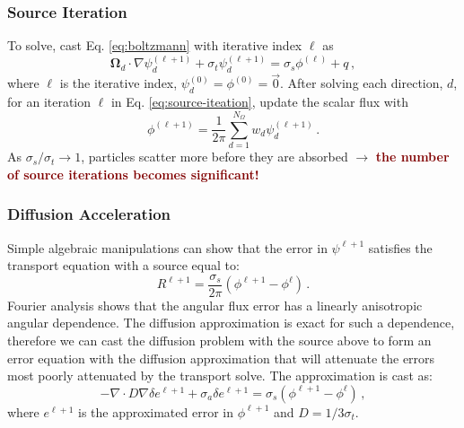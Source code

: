 \documentclass[xcolor={usenames,dvipsnames,svgnames,table}, 10pt]{beamer}
\newcommand{\vo}{\pmb{\Omega}} %
\begin{document}

\begin{frame}\frametitle{Source Iteration}
	To solve, cast Eq. \eqref{eq:boltzmann} with iterative index $\ell$ as
	\begin{equation}
		\label{eq:source-iteation}
		\vo_d \cdot \nabla \psi_d^{(\ell + 1)} + \sigma_t \psi_d^{(\ell + 1)} = \sigma_s \phi^{(\ell)} + q\,,
	\end{equation}
	where $\ell$ is the iterative index, $\psi_d^{(0)} = \phi^{(0)} = \vec{0}$. After solving each direction, $d$, for an iteration $\ell$ in Eq. \eqref{eq:source-iteation}, update the scalar flux with
	\[
		\phi^{(\ell + 1)} = \frac{1}{2\pi} \sum_{d = 1}^{N_\Omega} w_d \psi_d^{(\ell + 1)}\,.
	\]
	As $\sigma_s / \sigma_t \to 1$, particles scatter more before they are absorbed $\rightarrow$ \textbf{\textcolor{Maroon}{the number of source iterations becomes significant!}} 
\end{frame}


\begin{frame}\frametitle{Diffusion Acceleration}
	Simple algebraic manipulations can show that the error in $\psi^{\ell + 1}$ satisfies the transport equation with a source equal to:
	\[
		R^{\ell + 1} = \frac{\sigma_s}{2\pi} (\phi^{\ell + 1} - \phi^\ell)\,.
	\]
	Fourier analysis shows that the angular flux error has a linearly anisotropic angular dependence. The diffusion approximation is exact for such a dependence, therefore we can cast the diffusion problem with the source above to form an error equation with the diffusion approximation that will attenuate the errors most poorly attenuated by the transport solve. The approximation is cast as:
	\begin{equation}
		\label{eq:diffusion}
		-\nabla \cdot D \nabla \delta e^{\ell + 1} + \sigma_a \delta e^{\ell + 1} = \sigma_s \left( \phi^{\ell + 1} - \phi^\ell\right)\,,
	\end{equation}
	where $e^{\ell+1}$ is the approximated error in $\phi^{\ell + 1}$ and $D = 1/3 \sigma_t$.
\end{frame}

\end{document}
